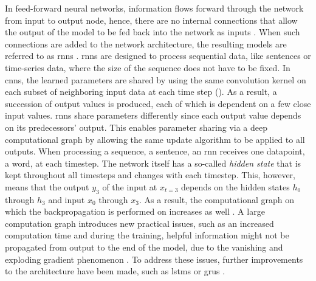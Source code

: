 In feed-forward neural networks, information flows forward through the network from input to output node, hence, there are no internal connections that allow
the output of the \gls{model} to be fed back into the network as inputs \cite{aggarwal2018NeuralNetworksDeep, Goodfellow-et-al-2016}.
When such connections are added to the network architecture, the resulting models are referred to as \glspl{rnn} \cite{rumelhart1986LearningInternalRepresentations}.
\Glspl{rnn} are designed to process sequential data, like sentences or time-series data, where the size of the sequence does not have to be fixed.
In \glspl{cnn}, the learned parameters are shared by using the same convolution kernel on each subset of neighboring input data at each time step (). 
As a result, a succession of output values is produced, each of which is dependent on a few close input values. 
\glspl{rnn} share parameters differently since each output value depends on its predecessors' output. 
This enables parameter sharing via a deep computational graph by allowing the same update algorithm to be applied to all outputs.
When processing a sequence, \eg a sentence, an \gls{rnn} receives one datapoint, \eg a word, at each timestep.
The network itself has a so-called \textit{hidden state} that is kept throughout all timesteps and changes with each timestep.
This, however, means that the output $y_3$ of the input at $x_{t=3}$ depends on the hidden states $h_0$ through $h_3$ and input $x_0$ through $x_3$.
As a result, the computational graph on which the backpropagation is performed on increases as well \cite{aggarwal2018NeuralNetworksDeep}.
A large computation graph introduces new practical issues, such as an increased computation time and during the training, helpful information might not be propagated from output to the end of the \gls{model},
due to the vanishing and exploding gradient phenomenon \cite{aggarwal2018NeuralNetworksDeep}.
To address these issues, further improvements to the architecture have been made, such as \glspl{lstm} \cite{hochreiter1997LongShortTermMemory} or \glspl{gru} \cite{cho2014PropertiesNeuralMachine}.

